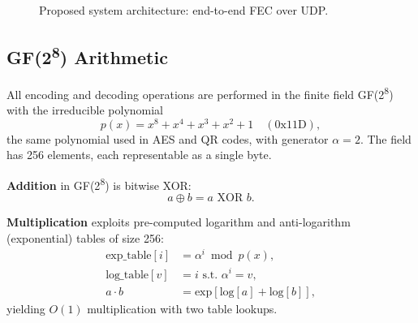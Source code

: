 \documentclass[conference]{IEEEtran}
\begin{document}
\begin{figure}[!t]
\centering
{}
\caption{Proposed system architecture: end-to-end FEC over UDP.}
\label{fig:arch}
\end{figure}

\subsection{GF(2\textsuperscript{8}) Arithmetic}

All encoding and decoding operations are performed in the finite field
GF(2\textsuperscript{8}) with the irreducible polynomial
\begin{equation}
  p(x) = x^8 + x^4 + x^3 + x^2 + 1 \quad (0\text{x}11\text{D}),
  \label{eq:irred}
\end{equation}
the same polynomial used in AES and QR codes, with generator
$\alpha = 2$. The field has 256 elements, each representable as a single
byte.

\noindent\textbf{Addition} in GF(2\textsuperscript{8}) is bitwise XOR:
\begin{equation}
  a \oplus b = a \text{ XOR } b.
\end{equation}

\noindent\textbf{Multiplication} exploits pre-computed logarithm and
anti-logarithm (exponential) tables of size 256:
\begin{align}
  \text{exp\_table}[i] &= \alpha^i \bmod p(x), \label{eq:exptbl}\\
  \text{log\_table}[v] &= i \text{ s.t. } \alpha^i = v, \label{eq:logtbl}\\
  a \cdot b &= \text{exp}[\text{log}[a] + \text{log}[b]], \label{eq:mul}
\end{align}
yielding $O(1)$ multiplication with two table lookups.
\end{document}
